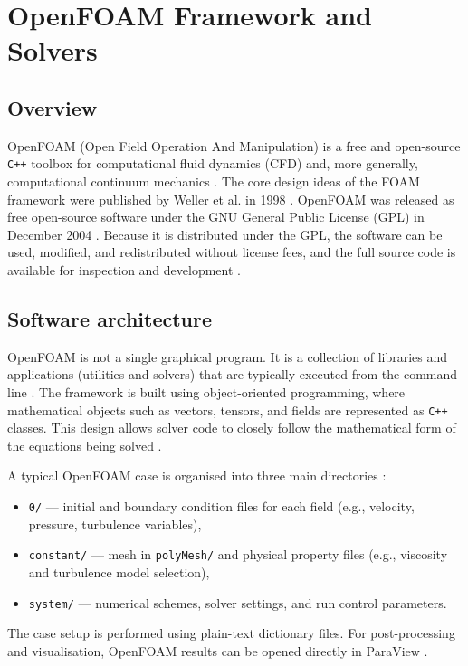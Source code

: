\section{OpenFOAM Framework and Solvers}
\label{sec:openfoam_framework}

\subsection*{Overview}
OpenFOAM (Open Field Operation And Manipulation) is a free and open-source \texttt{C++} toolbox for computational fluid dynamics (CFD) and, more generally, computational continuum mechanics \cite{Weller1998FOAM,Jasak2009OpenFOAM}. The core design ideas of the FOAM framework were published by Weller et al. in 1998 \cite{Weller1998FOAM}. OpenFOAM was released as free open-source software under the GNU General Public License (GPL) in December 2004 \cite{OpenFOAMOpenSource}. Because it is distributed under the GPL, the software can be used, modified, and redistributed without license fees, and the full source code is available for inspection and development \cite{OpenFOAMLicensing,OpenFOAMOpenSource}.

\subsection*{Software architecture}
OpenFOAM is not a single graphical program. It is a collection of libraries and applications (utilities and solvers) that are typically executed from the command line \cite{Weller1998FOAM,Jasak2009OpenFOAM}. The framework is built using object-oriented programming, where mathematical objects such as vectors, tensors, and fields are represented as \texttt{C++} classes. This design allows solver code to closely follow the mathematical form of the equations being solved \cite{Weller1998FOAM,Jasak2009OpenFOAM}.

A typical OpenFOAM case is organised into three main directories \cite{OpenFOAMUserGuide}:
\begin{itemize}
    \item \texttt{0/} --- initial and boundary condition files for each field (e.g., velocity, pressure, turbulence variables),
    \item \texttt{constant/} --- mesh in \texttt{polyMesh/} and physical property files (e.g., viscosity and turbulence model selection),
    \item \texttt{system/} --- numerical schemes, solver settings, and run control parameters.
\end{itemize}
The case setup is performed using plain-text dictionary files. For post-processing and visualisation, OpenFOAM results can be opened directly in ParaView \cite{Ahrens2005ParaView,OpenFOAMUserGuide}.

